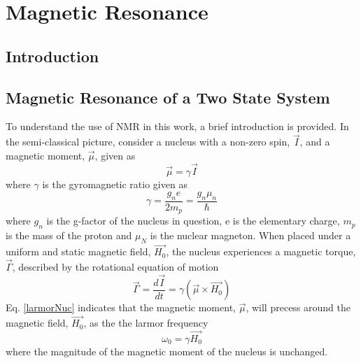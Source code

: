 
\chapter{Magnetic Resonance}

\section{Introduction}

\section{Magnetic Resonance of a Two State System}

To understand the use of NMR in this work, a brief introduction is provided. In the semi-classical picture, consider a nucleus with a non-zero spin, $\vec{I}$, and a magnetic moment, $\vec{\mu}$, given as
\begin{equation}
    \vec{\mu} = \gamma \vec{I}
\end{equation}
where $\gamma$ is the gyromagnetic ratio given as
\begin{equation}
    \gamma = \frac{g_ne}{2m_p} = \frac{g_n \mu_n}{\hbar}
\end{equation}
where $g_n$ is the g-factor of the nucleus in question, e is the elementary charge, $m_p$ is the mass of the proton and $\mu_N$ is the nuclear magneton. When placed under a uniform and static magnetic field, $\vec{H_0}$, the nucleus experiences a magnetic torque, $\vec{\Gamma}$, described by the rotational equation of motion
\begin{equation}\label{larmorNuc}
    \vec{\Gamma} = \frac{d\vec{I}}{dt} = \gamma \left( \vec{\mu} \times \vec{H_0} \right)
\end{equation}
Eq. \ref{larmorNuc} indicates that the magnetic moment, $\vec{\mu}$, will precess around the magnetic field, $\vec{H_0}$, as the the larmor frequency
\begin{equation}
    \omega_0 = \gamma \vec{H_0}
\end{equation}
where the magnitude of the magnetic moment of the nucleus is unchanged.

